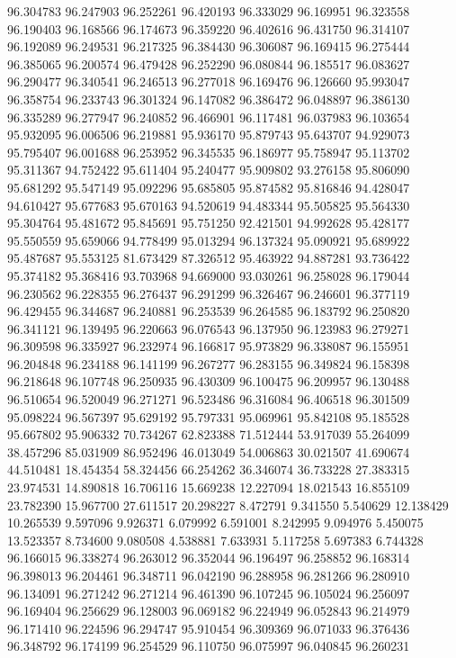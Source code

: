 96.304783
96.247903
96.252261
96.420193
96.333029
96.169951
96.323558
96.190403
96.168566
96.174673
96.359220
96.402616
96.431750
96.314107
96.192089
96.249531
96.217325
96.384430
96.306087
96.169415
96.275444
96.385065
96.200574
96.479428
96.252290
96.080844
96.185517
96.083627
96.290477
96.340541
96.246513
96.277018
96.169476
96.126660
95.993047
96.358754
96.233743
96.301324
96.147082
96.386472
96.048897
96.386130
96.335289
96.277947
96.240852
96.466901
96.117481
96.037983
96.103654
95.932095
96.006506
96.219881
95.936170
95.879743
95.643707
94.929073
95.795407
96.001688
96.253952
96.345535
96.186977
95.758947
95.113702
95.311367
94.752422
95.611404
95.240477
95.909802
93.276158
95.806090
95.681292
95.547149
95.092296
95.685805
95.874582
95.816846
94.428047
94.610427
95.677683
95.670163
94.520619
94.483344
95.505825
95.564330
95.304764
95.481672
95.845691
95.751250
92.421501
94.992628
95.428177
95.550559
95.659066
94.778499
95.013294
96.137324
95.090921
95.689922
95.487687
95.553125
81.673429
87.326512
95.463922
94.887281
93.736422
95.374182
95.368416
93.703968
94.669000
93.030261
96.258028
96.179044
96.230562
96.228355
96.276437
96.291299
96.326467
96.246601
96.377119
96.429455
96.344687
96.240881
96.253539
96.264585
96.183792
96.250820
96.341121
96.139495
96.220663
96.076543
96.137950
96.123983
96.279271
96.309598
96.335927
96.232974
96.166817
95.973829
96.338087
96.155951
96.204848
96.234188
96.141199
96.267277
96.283155
96.349824
96.158398
96.218648
96.107748
96.250935
96.430309
96.100475
96.209957
96.130488
96.510654
96.520049
96.271271
96.523486
96.316084
96.406518
96.301509
95.098224
96.567397
95.629192
95.797331
95.069961
95.842108
95.185528
95.667802
95.906332
70.734267
62.823388
71.512444
53.917039
55.264099
38.457296
85.031909
86.952496
46.013049
54.006863
30.021507
41.690674
44.510481
18.454354
58.324456
66.254262
36.346074
36.733228
27.383315
23.974531
14.890818
16.706116
15.669238
12.227094
18.021543
16.855109
23.782390
15.967700
27.611517
20.298227
8.472791
9.341550
5.540629
12.138429
10.265539
9.597096
9.926371
6.079992
6.591001
8.242995
9.094976
5.450075
13.523357
8.734600
9.080508
4.538881
7.633931
5.117258
5.697383
6.744328
96.166015
96.338274
96.263012
96.352044
96.196497
96.258852
96.168314
96.398013
96.204461
96.348711
96.042190
96.288958
96.281266
96.280910
96.134091
96.271242
96.271214
96.461390
96.107245
96.105024
96.256097
96.169404
96.256629
96.128003
96.069182
96.224949
96.052843
96.214979
96.171410
96.224596
96.294747
95.910454
96.309369
96.071033
96.376436
96.348792
96.174199
96.254529
96.110750
96.075997
96.040845
96.260231
